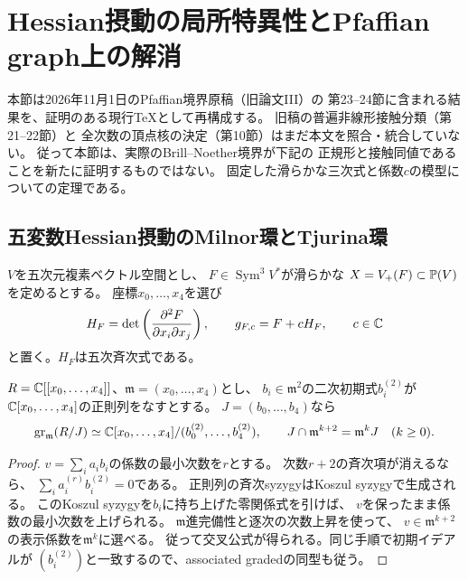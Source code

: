 \section{Hessian摂動の局所特異性とPfaffian graph上の解消}
\label{sec:pfaffian-hessian-local-geometry}
本節は2026年11月1日のPfaffian境界原稿（旧論文III）の
第23--24節に含まれる結果を、証明のある現行TeXとして再構成する。
旧稿の普遍非線形接触分類（第21--22節）と
全次数の頂点核の決定（第10節）はまだ本文を照合・統合していない。
従って本節は、実際のBrill--Noether境界が下記の
正規形と接触同値であることを新たに証明するものではない。
固定した滑らかな三次式と係数$c$の模型についての定理である。

\subsection{五変数Hessian摂動のMilnor環とTjurina環}
$V$を五次元複素ベクトル空間とし、
$F\in\operatorname{Sym}^3V^*$が滑らかな
$X=V_+(F)\subset\mathbb P(V)$を定めるとする。
座標$x_0,\ldots,x_4$を選び
\[
 H_F=\det\left(\frac{\partial^2 F}{\partial x_i\partial x_j}\right),
 \qquad g_{F,c}=F+cH_F,\qquad c\in\mathbb C
\]
と置く。$H_F$は五次斉次式である。

\begin{lemma}
\label{lem:hessian-filtered-koszul}
$R=\mathbb C[[x_0,\ldots,x_4]]$、$\mathfrak m=(x_0,\ldots,x_4)$とし、
$b_i\in\mathfrak m^2$の二次初期式$b_i^{(2)}$が
$\mathbb C[x_0,\ldots,x_4]$の正則列をなすとする。
$J=(b_0,\ldots,b_4)$なら
\[
 \operatorname{gr}_{\mathfrak m}(R/J)
 \simeq\mathbb C[x_0,\ldots,x_4]/(b_0^{(2)},\ldots,b_4^{(2)}),
 \qquad J\cap\mathfrak m^{k+2}=\mathfrak m^kJ\quad(k\ge0).
\]
\end{lemma}
\begin{proof}
$v=\sum_i a_ib_i$の係数の最小次数を$r$とする。
次数$r+2$の斉次項が消えるなら、
$\sum_i a_i^{(r)}b_i^{(2)}=0$である。
正則列の斉次syzygyはKoszul syzygyで生成される。
このKoszul syzygyを$b_i$に持ち上げた零関係式を引けば、
$v$を保ったまま係数の最小次数を上げられる。
$\mathfrak m$進完備性と逐次の次数上昇を使って、
$v\in\mathfrak m^{k+2}$の表示係数を$\mathfrak m^k$に選べる。
従って交叉公式が得られる。同じ手順で初期イデアルが
$(b_i^{(2)})$と一致するので、associated gradedの同型も従う。
\end{proof}


